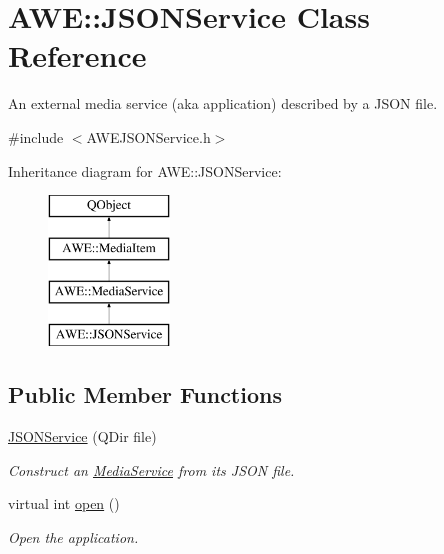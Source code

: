 \hypertarget{class_a_w_e_1_1_j_s_o_n_service}{\section{A\-W\-E\-:\-:J\-S\-O\-N\-Service Class Reference}
\label{class_a_w_e_1_1_j_s_o_n_service}
}


An external media service (aka application) described by a J\-S\-O\-N file.  




{\ttfamily \#include $<$A\-W\-E\-J\-S\-O\-N\-Service.\-h$>$}

Inheritance diagram for A\-W\-E\-:\-:J\-S\-O\-N\-Service\-:\begin{figure}[H]
\begin{center}
\leavevmode
\includegraphics[height=4.000000cm]{class_a_w_e_1_1_j_s_o_n_service}
\end{center}
\end{figure}
\subsection*{Public Member Functions}
\begin{DoxyCompactItemize}
\item 
\hyperlink{class_a_w_e_1_1_j_s_o_n_service_a9c701490ee5c4ed7b9dccf033de886b1}{J\-S\-O\-N\-Service} (Q\-Dir file)
\begin{DoxyCompactList}\small\item\em Construct an \hyperlink{class_a_w_e_1_1_media_service}{Media\-Service} from its J\-S\-O\-N file. \end{DoxyCompactList}\item 
virtual int \hyperlink{class_a_w_e_1_1_j_s_o_n_service_a19bbb59a75a05ad22d768d73febeeeda}{open} ()
\begin{DoxyCompactList}\small\item\em Open the application. \end{DoxyCompactList}\end{DoxyCompactItemize}
